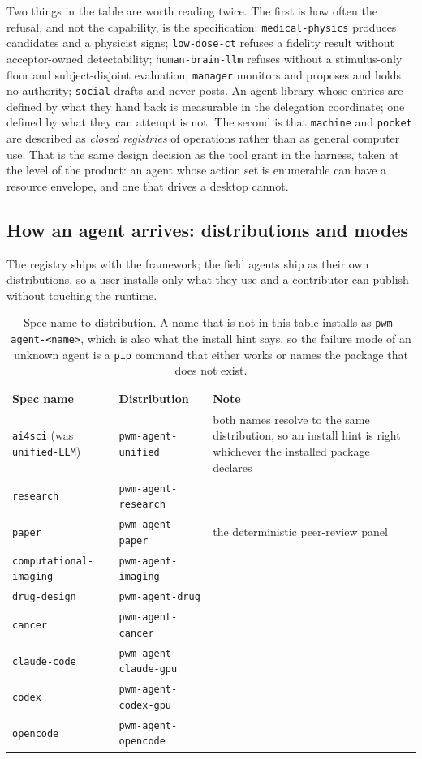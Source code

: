 \documentclass[11pt]{article}
\theoremstyle{definition}
\begin{document}
Two things in the table are worth reading twice. The first is how often the refusal, and not the capability, is the specification: \texttt{medical-physics} produces candidates and a physicist signs; \texttt{low-dose-ct} refuses a fidelity result without acceptor-owned detectability; \texttt{human-brain-llm} refuses without a stimulus-only floor and subject-disjoint evaluation; \texttt{manager} monitors and proposes and holds no authority; \texttt{social} drafts and never posts. An agent library whose entries are defined by what they hand back is measurable in the delegation coordinate; one defined by what they can attempt is not. The second is that \texttt{machine} and \texttt{pocket} are described as \emph{closed registries} of operations rather than as general computer use. That is the same design decision as the tool grant in the harness, taken at the level of the product: an agent whose action set is enumerable can have a resource envelope, and one that drives a desktop cannot.

\subsection{How an agent arrives: distributions and modes}\label{sec:dists}

The registry ships with the framework; the field agents ship as their own distributions, so a user installs only what they use and a contributor can publish without touching the runtime.

\begin{table}[!htbp]
\centering\small
\begin{tabularx}{\textwidth}{@{}llY@{}}
\toprule
Spec name & Distribution & Note \\
\midrule
\texttt{ai4sci} (was \texttt{unified-LLM}) & \texttt{pwm-agent-unified} & both names resolve to the same distribution, so an install hint is right whichever the installed package declares \\
\texttt{research} & \texttt{pwm-agent-research} & \\
\texttt{paper} & \texttt{pwm-agent-paper} & the deterministic peer-review panel \\
\texttt{computational-\allowbreak imaging} & \texttt{pwm-agent-imaging} & \\
\texttt{drug-design} & \texttt{pwm-agent-drug} & \\
\texttt{cancer} & \texttt{pwm-agent-cancer} & \\
\texttt{claude-code} & \texttt{pwm-agent-claude-gpu} & \\
\texttt{codex} & \texttt{pwm-agent-codex-gpu} & \\
\texttt{opencode} & \texttt{pwm-agent-opencode} & \\
\bottomrule
\end{tabularx}
\caption{Spec name to distribution. A name that is not in this table installs as \texttt{pwm-agent-<name>}, which is also what the install hint says, so the failure mode of an unknown agent is a \texttt{pip} command that either works or names the package that does not exist.}
\label{tab:dists}
\end{table}
\end{document}
